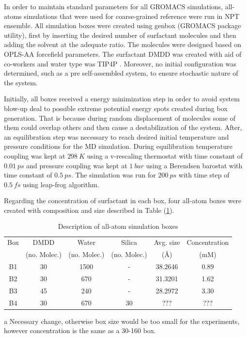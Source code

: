\documentclass[10pt,a4paper,twoside]{article}
\begin{document}
In order to maintain standard parameters for all GROMACS simulations, all-atoms simulations that were used for coarse-grained reference were run in NPT ensemble. All simulation boxes were created using genbox (GROMACS package utility), first by inserting the desired number of surfactant molecules and then adding the solvent at the adequate ratio. The molecules were designed based on OPLS-AA forcefield \cite{opls} parameters. %
The surfactant DMDD was created with aid of co-workers and water type was TIP4P \cite{tip4p}. %
Moreover, no initial configuration was determined, such as a pre self-assembled system, to ensure stochastic nature of the system.  

Initially, all boxes received a energy minimization step in order to avoid system blow-up deal to possible extreme potential energy spots created during box generation. That is because during random displacement of molecules some of them could overlap others and then cause a destabilization of the system. After, an equilibration step was necessary to reach desired initial temperature and pressure conditions for the MD simulation. During equilibration temperature coupling was kept at $298\ K$ using a v-rescaling thermostat \cite{vtstat} with time constant of $0.01\ ps$ and pressure coupling was kept at $1\ bar$ using a Berendsen barostat \cite{bbtat} with time constant of $0.5\ ps$.  The simulation was run for $200\ ps$ with time step of $0.5\ fs$ using leap-frog algorithm.

Regarding the concentration of surfactant in each box, four all-atom boxes were created with composition and size described in Table (\ref{tab:boxes}). 
\begin{table}[ht!] 
  \centering
\begin{threeparttable}

  \caption{Description of all-atom simulation boxes}

    \begin{tabular}{cccccc}
    \toprule
    Box &  DMDD &  Water & Silica & Avg. size & Concentration \\
	& (no. Molec.) & (no. Molec.) & (no. Molec.)  & (\AA) & (mM)\\
    \midrule
    B1   & 30  & 1500  & -  & 38.2646 & 0.89\\
    B2   & 30  & 670  & -   &  31.3201 & 1.62\\
    B3   & 45\tnote{a}  & 240  & -  & 28.2972 & 3.30\\
    B4   & 30  & 670  &  30  & ??? & ???\\
    \bottomrule
    \end{tabular}%
    \begin{tablenotes}
    	\item[a] Necessary change, otherwise box size would be too small for the experiments, however concentration is the same as a 30-160 box.
    \end{tablenotes}
  \label{tab:boxes}%
\end{threeparttable} 
\end{table}
\end{document}
